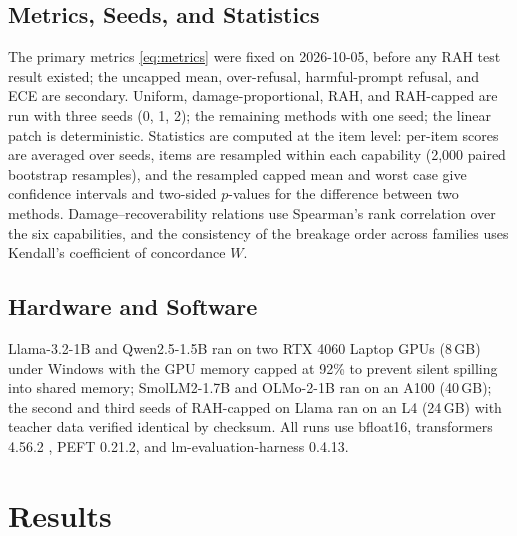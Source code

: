 \documentclass{ieeeaccess}
\newcommand{\RAH}{RAH}
\begin{document}
\subsection{Metrics, Seeds, and Statistics}
The primary metrics \eqref{eq:metrics} were fixed on 2026-10-05, before any \RAH{} test result existed; the uncapped mean, over-refusal, harmful-prompt refusal, and ECE are secondary. Uniform, damage-proportional, \RAH, and \RAH-capped are run with three seeds (0, 1, 2); the remaining methods with one seed; the linear patch is deterministic. Statistics are computed at the item level: per-item scores are averaged over seeds, items are resampled within each capability (2,000 paired bootstrap resamples), and the resampled capped mean and worst case give confidence intervals and two-sided $p$-values for the difference between two methods. Damage--recoverability relations use Spearman's rank correlation over the six capabilities, and the consistency of the breakage order across families uses Kendall's coefficient of concordance $W$.

\subsection{Hardware and Software}
Llama-3.2-1B and Qwen2.5-1.5B ran on two RTX 4060 Laptop GPUs (8\,GB) under Windows with the GPU memory capped at 92\% to prevent silent spilling into shared memory; SmolLM2-1.7B and OLMo-2-1B ran on an A100 (40\,GB); the second and third seeds of \RAH-capped on Llama ran on an L4 (24\,GB) with teacher data verified identical by checksum. All runs use bfloat16, transformers 4.56.2 \cite{wolf2020transformers}, PEFT 0.21.2, and lm-evaluation-harness 0.4.13.

\section{Results}
\label{sec:results}
\end{document}

